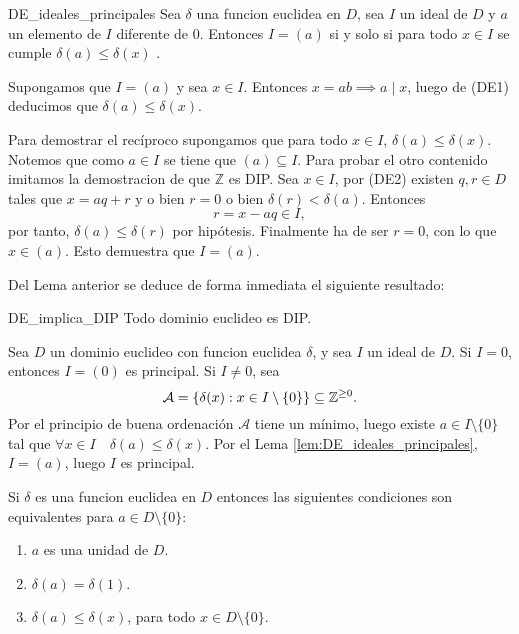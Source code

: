 \begin{lemma}{}{DE_ideales_principales}
Sea \(\delta\) una funcion euclidea en \(D\), sea \(I\) un ideal de \(D\) y \(a\) un elemento de \(I\) diferente de \(0\). Entonces \(I = (a)\) si y solo si para todo \(x \in I\) se cumple \(\delta(a) \leq \delta(x)\) .
\end{lemma}

\begin{proofbox}
Supongamos que \(I = (a)\) y sea \(x \in I\). Entonces \(x = ab \implies a \mid x\), luego de (DE1) deducimos que \(\delta(a) \leq \delta(x)\).

Para demostrar el recíproco supongamos que para todo \(x \in I\), \(\delta(a) \leq \delta(x)\). Notemos que como \(a \in I\) se tiene que \((a) \subseteq I\). Para probar el otro contenido imitamos la demostracion de que \(\mathbb{Z}\) es DIP. Sea \(x \in I\), por (DE2) existen \(q, r \in D\) tales que \(x = aq + r\) y o bien \(r = 0\) o bien \(\delta(r) < \delta(a)\). Entonces
\[
r = x - aq \in I,
\]
por tanto, \(\delta(a) \leq \delta(r)\) por hipótesis. Finalmente ha de ser \(r = 0\), con lo que \(x \in (a)\). Esto demuestra que \(I = (a)\).
\end{proofbox}

Del Lema anterior se deduce de forma inmediata el siguiente resultado:

\begin{theorem}{}{DE_implica_DIP}
Todo dominio euclideo es DIP.
\end{theorem}

\begin{proofbox}
Sea \(D\) un dominio euclideo con funcion euclidea \(\delta\), y sea \(I\) un ideal de \(D\). Si \(I = 0\), entonces \(I = (0)\) es principal. Si \(I \neq 0\), sea
\[
\mathcal{A} = \{\delta(x) : x \in I \setminus \{0\}\} \subseteq \mathbb{Z}^{\geq 0}.
\]
Por el principio de buena ordenación $\mathcal{A}$ tiene un mínimo, luego existe \(a \in I \setminus \{0\}\) tal que \(\forall x \in I \quad \delta(a) \leq \delta(x)\). Por el Lema \ref{lem:DE_ideales_principales}, \(I = (a)\), luego \(I\) es principal.
\end{proofbox}

\begin{lemma}{}{}
Si \(\delta\) es una funcion euclidea en \(D\) entonces las siguientes condiciones son equivalentes para \(a \in D \setminus \{0\}\):

\begin{enumerate}
\item \(a\) es una unidad de \(D\).

\item \(\delta(a) = \delta(1)\).

\item \(\delta(a) \leq \delta(x)\), para todo \(x \in D \setminus \{0\}\).
\end{enumerate}

\end{lemma}


